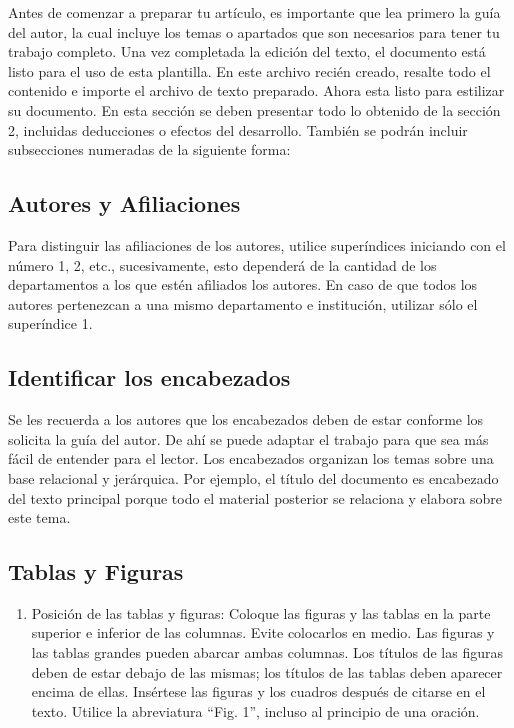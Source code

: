     Antes de comenzar a preparar tu artículo, es importante que lea primero la guía del autor, la cual incluye los temas o apartados que son necesarios para tener tu trabajo completo.
    Una vez completada la edición del texto, el documento está listo para el uso de esta plantilla. En este archivo recién creado, resalte todo el contenido e importe el archivo de texto preparado. Ahora esta listo para estilizar su documento.
    En esta sección se deben presentar todo lo obtenido de la sección 2, incluidas deducciones o efectos del desarrollo. También se podrán incluir subsecciones numeradas de la siguiente forma:
    
    \subsection{Autores y Afiliaciones}
    
    Para distinguir las afiliaciones de los autores, utilice superíndices iniciando con el número 1, 2, etc., sucesivamente, esto dependerá de la cantidad de los departamentos a los que estén afiliados los autores. En caso de que todos los autores pertenezcan a una mismo departamento e institución, utilizar sólo el superíndice 1. 
    
    \subsection{Identificar los encabezados}
    
    Se les recuerda a los autores que los encabezados deben de estar conforme los solicita la guía del autor. De ahí se puede adaptar el trabajo para que sea más fácil de entender para el lector.
    Los encabezados organizan los temas sobre una base relacional y jerárquica. Por ejemplo, el título del documento es encabezado del texto principal porque todo el material posterior se relaciona y elabora sobre este tema. 
    
    \subsection{Tablas y Figuras}
    
    \begin{enumerate}
        \item Posición de las tablas y figuras: Coloque las figuras y las tablas en la parte superior e inferior de las columnas. Evite colocarlos en medio. Las figuras y las tablas grandes pueden abarcar ambas columnas. Los títulos de las figuras deben de estar debajo de las mismas; los títulos de las tablas deben aparecer encima de ellas. Insértese las figuras y los cuadros después de citarse en el texto. Utilice la abreviatura “Fig. 1”, incluso al principio de una oración. 
    \end{enumerate}

